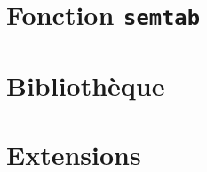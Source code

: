 \documentclass{article}
\begin{document}
\thispagestyle{empty}
\tableofcontents
\pagebreak
\setcounter{page}{1}

\section{Fonction \texttt{semtab}}

\section{Bibliothèque}

\section{Extensions}
\end{document}
